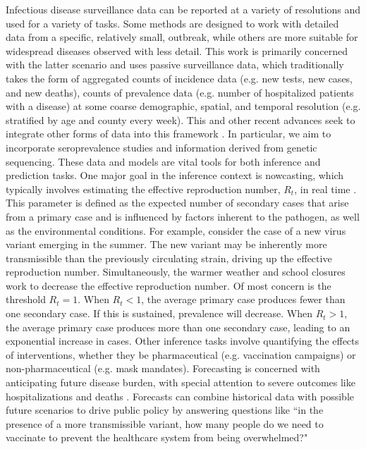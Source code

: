 Infectious disease surveillance data can be reported at a variety of resolutions and used for a variety of tasks.
Some methods are designed to work with detailed data from a specific, relatively small, outbreak, while others are more suitable for widespread diseases observed with less detail.
This work is primarily concerned with the latter scenario and uses passive surveillance data, which traditionally takes the form of aggregated counts of incidence data (e.g. new tests, new cases, and new deaths), counts of prevalence data (e.g. number of hospitalized patients with a disease) at some coarse demographic, spatial, and temporal resolution (e.g. stratified by age and county every week).
This and other recent advances seek to integrate other forms of data into this framework \citep{Tang2022, Rasmussen2011}.
In particular, we aim to incorporate seroprevalence studies and information derived from genetic sequencing.
These data and models are vital tools for both inference and prediction tasks.
One major goal in the inference context is nowcasting, which typically involves estimating the effective reproduction number, \( R_t \), in real time \citep{10.1093/aje/kwt133}.
This parameter is defined as the expected number of secondary cases that arise from a primary case and is influenced by factors inherent to the pathogen, as well as the environmental conditions.
For example, consider the case of a new virus variant emerging in the summer.
The new variant may be inherently more transmissible than the previously circulating strain, driving up the effective reproduction number.
Simultaneously, the warmer weather and school closures work to decrease the effective reproduction number.
Of most concern is the threshold \( R_t = 1 \).
When \( R_t < 1 \), the average primary case produces fewer than one secondary case.
If this is sustained, prevalence will decrease.
When \( R_t > 1 \), the average primary case produces more than one secondary case, leading to an exponential increase in cases.
Other inference tasks involve quantifying the effects of interventions, whether they be pharmaceutical (e.g. vaccination campaigns) or non-pharmaceutical (e.g. mask mandates).
Forecasting is concerned with anticipating future disease burden, with special attention to severe outcomes like hospitalizations and deaths \citep{10.1371/journal.pmed.1003793}.
Forecasts can combine historical data with possible future scenarios to drive public policy by answering questions like ``in the presence of a more transmissible variant, how many people do we need to vaccinate to prevent the healthcare system from being overwhelmed?"

